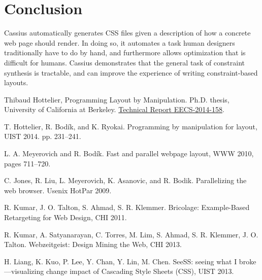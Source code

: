 \documentclass[10pt]{sigplanconf}
\newcommand{\name}{Cassius\xspace}
\begin{document}
\section{Conclusion}

\name automatically generates CSS files
  given a description of how a concrete web page should render.
In doing so, it automates a task
  human designers traditionally have to do by hand,
  and furthermore allows optimization
  that is difficult for humans.
\name demonstrates that the general task of constraint synthesis
  is tractable, and can improve the experience
  of writing constraint-based layouts.

\begin{thebibliography}{9}

  Thibaud Hottelier,
  Programming Layout by Manipulation.
  Ph.D. thesis, University of California at Berkeley.
  \href{http://www.eecs.berkeley.edu/Pubs/TechRpts/2014/EECS-2014-158.html}{Technical Report EECS-2014-158}.

  T. Hottelier, R. Bod\'ik, and K. Ryokai.
  Programming by manipulation for layout,
  UIST 2014. pp. 231--241.

  L. A. Meyerovich and R. Bod\'ik.
  Fast and parallel webpage layout,
  WWW 2010, pages 711–720. 

  C. Jones, R. Liu, L. Meyerovich, K. Asanovic, and R. Bodik.
  Parallelizing the web browser.
  Usenix HotPar 2009. 
  
   R. Kumar, J. O. Talton, S. Ahmad, S. R. Klemmer.
   Bricolage: Example-Based Retargeting for Web Design,
   CHI 2011.

  R. Kumar, A. Satyanarayan, C. Torres, M. Lim, S. Ahmad, S. R. Klemmer, J. O. Talton.
  Webzeitgeist: Design Mining the Web,
  CHI 2013. 
  
  H. Liang, K. Kuo, P. Lee, Y. Chan, Y. Lin, M. Chen.
  SeeSS: seeing what I broke---visualizing change impact of Cascading Style Sheets (CSS),
  UIST 2013.


\end{thebibliography}
\end{document}
